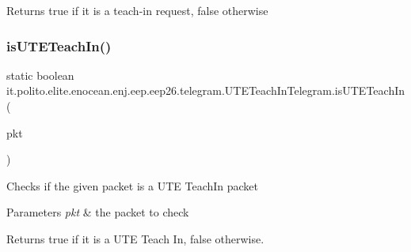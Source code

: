 \begin{DoxyReturn}{Returns}
true if it is a teach-\/in request, false otherwise 
\end{DoxyReturn}
\hypertarget{classit_1_1polito_1_1elite_1_1enocean_1_1enj_1_1eep_1_1eep26_1_1telegram_1_1_u_t_e_teach_in_telegram_a38e8debb34a336c073fbe6255d1f02b6}{}\label{classit_1_1polito_1_1elite_1_1enocean_1_1enj_1_1eep_1_1eep26_1_1telegram_1_1_u_t_e_teach_in_telegram_a38e8debb34a336c073fbe6255d1f02b6} 
\subsubsection{\texorpdfstring{is\+U\+T\+E\+Teach\+In()}{isUTETeachIn()}}
{\footnotesize\ttfamily static boolean it.\+polito.\+elite.\+enocean.\+enj.\+eep.\+eep26.\+telegram.\+U\+T\+E\+Teach\+In\+Telegram.\+is\+U\+T\+E\+Teach\+In (\begin{DoxyParamCaption}\item[{\hyperlink{classit_1_1polito_1_1elite_1_1enocean_1_1protocol_1_1serial_1_1v3_1_1network_1_1packet_1_1_e_s_p3_packet}{E\+S\+P3\+Packet}}]{pkt }\end{DoxyParamCaption})\hspace{0.3cm}{\ttfamily [static]}}

Checks if the given packet is a U\+TE Teach\+In packet


\begin{DoxyParams}{Parameters}
{\em pkt} & the packet to check \\
\hline
\end{DoxyParams}
\begin{DoxyReturn}{Returns}
true if it is a U\+TE Teach In, false otherwise. 
\end{DoxyReturn}
\hypertarget{classit_1_1polito_1_1elite_1_1enocean_1_1enj_1_1eep_1_1eep26_1_1telegram_1_1_u_t_e_teach_in_telegram_a012aabb551b128e915c003be7e7a9983}{}\label{classit_1_1polito_1_1elite_1_1enocean_1_1enj_1_1eep_1_1eep26_1_1telegram_1_1_u_t_e_teach_in_telegram_a012aabb551b128e915c003be7e7a9983} 
